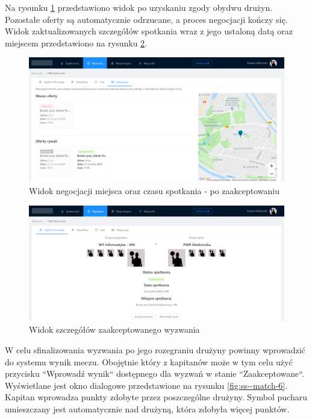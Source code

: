 Na rysunku \ref{fig:ss--match-3} przedstawiono widok po uzyskaniu zgody obydwu drużyn. Pozostałe oferty są automatycznie odrzucane, a proces negocjacji kończy się. Widok zaktualizowanych szczegółów spotkania wraz z jego ustaloną datą oraz miejscem przedstawiono na rysunku \ref{fig:ss--match-4}.

\begin{figure}[H]
\centering
\includegraphics[width=\linewidth]{065-dzialanie/rys/ss-match-3.PNG}
\caption{Widok negocjacji miejsca oraz czasu spotkania - po zaakceptowaniu}
\label{fig:ss--match-3}
\end{figure}

\begin{figure}[H]
\centering
\includegraphics[width=\linewidth]{065-dzialanie/rys/ss-match-4.PNG}
\caption{Widok szczegółów zaakceptowanego wyzwania}
\label{fig:ss--match-4}
\end{figure}

W celu sfinalizowania wyzwania po jego rozegraniu drużyny powinny wprowadzić do systemu wynik meczu. Obojętnie który z kapitanów może w tym celu użyć przycisku ``Wprowadź wynik`` dostępnego dla wyzwań w stanie ``Zaakceptowane``. Wyświetlane jest okno dialogowe przedstawione na rysunku \ref{fig:ss--match-6}. Kapitan wprowadza punkty zdobyte przez poszczególne drużyny. Symbol pucharu umieszczany jest automatycznie nad drużyną, która zdobyła więcej punktów.

